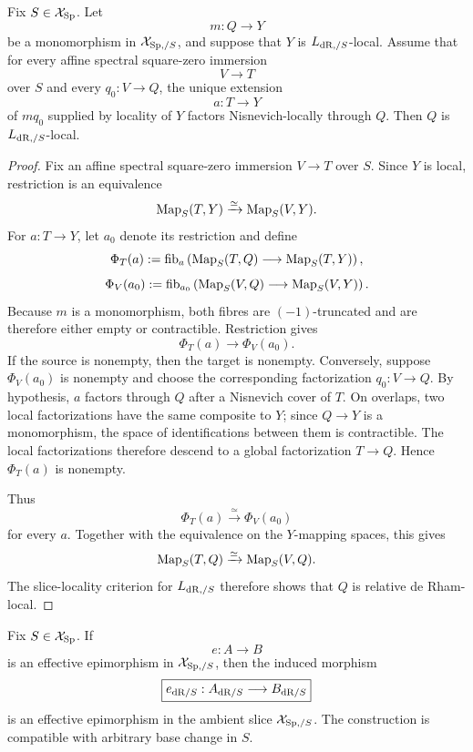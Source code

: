 \begin{lemma}
\label{lem:relative-dr-image-locality}
Fix \(S\in\mathcal X_{\mathrm{Sp}}\).  Let
\[
    m:Q\longrightarrow Y
\]
be a monomorphism in \(\mathcal X_{\mathrm{Sp},/S}\), and suppose that \(Y\) is
\(L_{\mathrm{dR},/S}\)-local.  Assume that for every affine spectral square-zero immersion
\[
    V\longrightarrow T
\]
over \(S\) and every \(q_0:V\to Q\), the unique extension
\[
    a:T\longrightarrow Y
\]
of \(mq_0\) supplied by locality of \(Y\) factors Nisnevich-locally through \(Q\).  Then \(Q\) is
\(L_{\mathrm{dR},/S}\)-local.
\end{lemma}

\begin{proof}
Fix an affine spectral square-zero immersion \(V\to T\) over \(S\).  Since \(Y\) is local,
restriction is an equivalence
\[
    \operatorname{Map}_S(T,Y)\xrightarrow{\simeq}\operatorname{Map}_S(V,Y).
\]
For \(a:T\to Y\), let \(a_0\) denote its restriction and define
\[
    \Phi_T(a)
    :=
    \operatorname{fib}_a
    \left(
        \operatorname{Map}_S(T,Q)\longrightarrow\operatorname{Map}_S(T,Y)
    \right),
\]
\[
    \Phi_V(a_0)
    :=
    \operatorname{fib}_{a_0}
    \left(
        \operatorname{Map}_S(V,Q)\longrightarrow\operatorname{Map}_S(V,Y)
    \right).
\]
Because \(m\) is a monomorphism, both fibres are \((-1)\)-truncated and are therefore either empty
or contractible.  Restriction gives
\[
    \Phi_T(a)\longrightarrow\Phi_V(a_0).
\]
If the source is nonempty, then the target is nonempty.  Conversely, suppose
\(\Phi_V(a_0)\) is nonempty and choose the corresponding factorization \(q_0:V\to Q\).  By
hypothesis, \(a\) factors through \(Q\) after a Nisnevich cover of \(T\).  On overlaps, two local
factorizations have the same composite to \(Y\); since \(Q\to Y\) is a monomorphism, the space of
identifications between them is contractible.  The local factorizations therefore descend to a
global factorization \(T\to Q\).  Hence \(\Phi_T(a)\) is nonempty.

Thus
\[
    \Phi_T(a)\xrightarrow{\simeq}\Phi_V(a_0)
\]
for every \(a\).  Together with the equivalence on the \(Y\)-mapping spaces, this gives
\[
    \operatorname{Map}_S(T,Q)\xrightarrow{\simeq}\operatorname{Map}_S(V,Q).
\]
The slice-locality criterion for \(L_{\mathrm{dR},/S}\) therefore shows that \(Q\) is relative
de Rham-local.
\end{proof}

\begin{theorem}
\label{thm:relative-dr-preserves-effective-epis}
Fix \(S\in\mathcal X_{\mathrm{Sp}}\).  If
\[
    e:A\longrightarrow B
\]
is an effective epimorphism in \(\mathcal X_{\mathrm{Sp},/S}\), then the induced morphism
\[
\boxed{
    e_{\mathrm{dR}/S}:
    A_{\mathrm{dR}/S}
    \longrightarrow
    B_{\mathrm{dR}/S}
}
\]
is an effective epimorphism in the ambient slice \(\mathcal X_{\mathrm{Sp},/S}\).  The construction is
compatible with arbitrary base change in \(S\).
\end{theorem}

